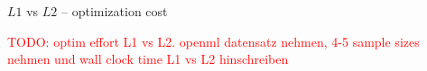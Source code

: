 \documentclass[11pt,compress,t,notes=noshow, xcolor=table]{beamer}
\begin{document}

\begin{vbframe}{$L1$ vs $L2$ -- optimization cost}

\textcolor{red}{TODO: optim effort L1 vs L2. openml datensatz nehmen, 4-5 sample 
sizes nehmen und wall clock time L1 vs L2 hinschreiben}

\end{vbframe}

\endlecture
\end{document}
